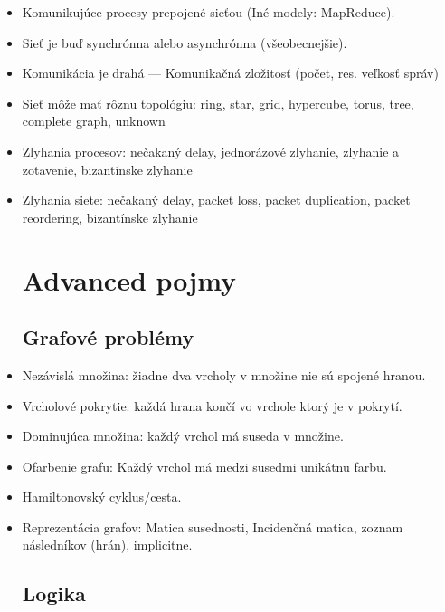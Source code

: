 \documentclass[paper=a4, fontsize=11pt]{scrartcl} %
\numberwithin{equation}{section} %
\numberwithin{figure}{section} %
\numberwithin{table}{section} %
\begin{document}
\begin{itemize}
	\item Komunikujúce procesy prepojené sieťou (Iné modely: MapReduce).
	
	\item Sieť je buď synchrónna alebo asynchrónna (všeobecnejšie).
	
	\item Komunikácia je drahá — Komunikačná zložitosť (počet, res. veľkosť správ)
	
	\item Sieť môže mať rôznu topológiu: ring, star, grid, hypercube, torus, tree, complete graph, unknown
	
	\item Zlyhania procesov: nečakaný delay, jednorázové zlyhanie, zlyhanie a zotavenie, bizantínske zlyhanie
	
	\item Zlyhania siete: nečakaný delay, packet loss, packet duplication, packet reordering, bizantínske zlyhanie

	\section{Advanced pojmy}
	
	\subsection{Grafové problémy}
	
	\item Nezávislá množina: žiadne dva vrcholy v množine nie sú spojené hranou.
	
	\item Vrcholové pokrytie: každá hrana končí vo vrchole ktorý je v pokrytí.
	
	\item Dominujúca množina: každý vrchol má suseda v množine.
	
	\item Ofarbenie grafu: Každý vrchol má medzi susedmi unikátnu farbu.
	
	\item Hamiltonovský cyklus/cesta.
	
	\item Reprezentácia grafov: Matica susednosti, Incidenčná matica, zoznam následníkov (hrán), implicitne.
	 
	 \subsection{Logika}
	 

\end{itemize}
\end{document}
